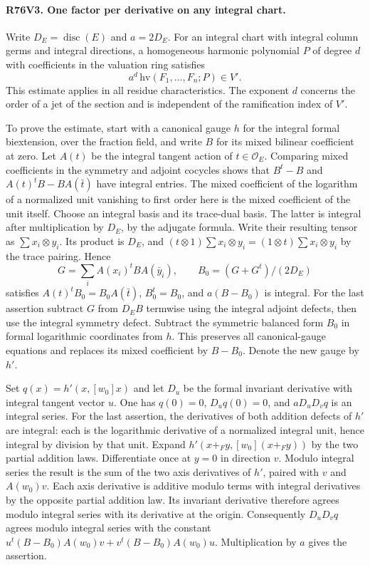 \paragraph{R76V3. One factor per derivative on any integral chart.}
Write $D_E=\operatorname{disc}(E)$ and $a=2D_E$. For an integral
chart with integral column germs and integral directions, a
homogeneous harmonic polynomial $P$ of degree $d$ with coefficients
in the valuation ring satisfies
\[
             a^d\,\mathrm{hv}(F_1,\ldots,F_n;P)\in V'.
\]
This estimate applies in all residue characteristics. The
exponent $d$ concerns the order of a jet of the section and is
independent of the ramification index of $V'$.

To prove the estimate, start with a canonical gauge $h$ for the
integral formal biextension, over the fraction field, and write $B$
for its mixed bilinear coefficient at zero. Let $A(t)$ be the
integral tangent action of $t\in\mathcal O_E$. Comparing mixed
coefficients in the symmetry and adjoint cocycles shows that
$B^t-B$ and $A(t)^tB-BA(\bar t)$ have integral entries. The
mixed coefficient of the logarithm of a normalized unit vanishing
to first order here is the mixed coefficient of the unit itself.
Choose an integral basis and its trace-dual basis. The latter is
integral after multiplication by $D_E$, by the adjugate formula.
Write their resulting tensor as $\sum x_i\otimes y_i$. Its
product is $D_E$, and $(t\otimes1)\sum x_i\otimes y_i=
(1\otimes t)\sum x_i\otimes y_i$ by the trace pairing. Hence
\[
   G=\sum_i A(x_i)^t B A(\bar y_i),\qquad
   B_0=(G+G^t)/(2D_E)
\]
satisfies $A(t)^t B_0=B_0 A(\bar t)$, $B_0^t=B_0$, and
$a(B-B_0)$ is integral. For the last assertion subtract $G$
from $D_EB$ termwise using the integral adjoint defects, then
use the integral symmetry defect. Subtract the symmetric balanced
form $B_0$ in formal logarithmic coordinates from $h$. This
preserves all canonical-gauge equations and replaces its mixed
coefficient by $B-B_0$. Denote the new gauge by $h'$.

Set $q(x)=h'(x,[w_0]x)$ and let $D_u$ be the formal invariant
derivative with integral tangent vector $u$. One has $q(0)=0$,
$D_u q(0)=0$, and $aD_uD_vq$ is an integral series. For the
last assertion, the derivatives of both addition defects of $h'$
are integral: each is the logarithmic derivative of a normalized
integral unit, hence integral by division by that unit. Expand
$h'(x+_F y,[w_0](x+_F y))$ by the two partial addition laws.
Differentiate once at $y=0$ in direction $v$. Modulo integral
series the result is the sum of the two axis derivatives of $h'$,
paired with $v$ and $A(w_0)v$. Each axis derivative is additive
modulo terms with integral derivatives by the opposite partial
addition law. Its invariant derivative therefore agrees modulo
integral series with its derivative at the origin. Consequently
$D_uD_v q$ agrees modulo integral series with the constant
$u^t(B-B_0)A(w_0)v+v^t(B-B_0)A(w_0)u$. Multiplication by $a$
gives the assertion.

